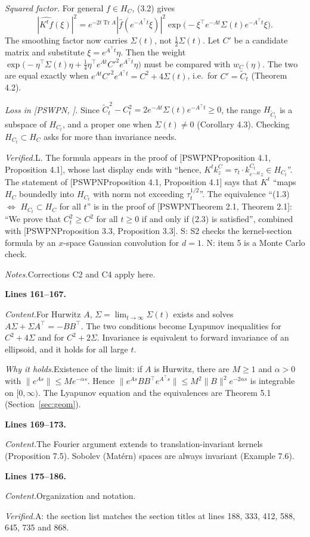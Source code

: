 \documentclass[11pt]{amsart}
\newcommand{\Tr}{\operatorname{Tr}}
\newcommand{\Ct}{\widetilde{C}_t}
\newcommand{\hatf}[1]{\widehat{#1}}
\newcommand{\tp}{\top}
\newcommand{\src}[1]{\par\bigskip\noindent\textbf{Lines #1.}\enspace}
\newcommand{\content}{\par\smallskip\noindent\textit{Content.}\enspace}
\newcommand{\why}{\par\smallskip\noindent\textit{Why it holds.}\enspace}
\newcommand{\verified}{\par\smallskip\noindent\textit{Verified.}\enspace}
\newcommand{\notes}{\par\smallskip\noindent\textit{Notes.}\enspace}
\newcommand{\tA}{\textsf{A}}
\newcommand{\tS}{\textsf{S}}
\newcommand{\tN}{\textsf{N}}
\newcommand{\tL}{\textsf{L}}
\newcommand{\PS}[1][]{[PSWPN\ifx\relax#1\relax\else, #1\fi]}
\begin{document}
\emph{Squared factor.} For general $f\in H_C$, (3.2) gives
\[
|\hatf{K^tf}(\xi)|^2=e^{-2t\Tr A}|\hatf f(e^{-A^\tp t}\xi)|^2\exp\bigl(-\xi^\tp e^{-At}\Sigma(t)e^{-A^\tp t}\xi\bigr).
\]
The smoothing factor now carries $\Sigma(t)$, not $\frac12\Sigma(t)$. Let $C'$ be a candidate matrix and substitute
$\xi=e^{A^\tp t}\eta$. Then the weight $\exp\bigl(-\eta^\tp\Sigma(t)\eta+\frac14\eta^\tp e^{At}C'^2e^{A^\tp t}\eta\bigr)$
must be compared with $w_C(\eta)$. The two are equal exactly when $e^{At}C'^2e^{A^\tp t}=C^2+4\Sigma(t)$, i.e.\ for
$C'=\Ct$ (Theorem 4.2).

\emph{Loss in \PS.} Since $\Ct^{\,2}-C_t^2=2e^{-At}\Sigma(t)e^{-A^\tp t}\ge0$, the range $H_{\Ct}$ is a subspace of
$H_{C_t}$, and a proper one when $\Sigma(t)\ne0$ (Corollary 4.3). Checking $H_{C_t}\subset H_C$ asks for more than
invariance needs.
\verified \tL. The formula appears in the proof of \PS[Proposition 4.1], whose last display ends with ``hence,
$K^tk^C_z=\tau_t\cdot k^{C_t}_{e^{-At}z}\in H_{C_t}$''. The statement of \PS[Proposition 4.1] says that $K^t$ ``maps
$H_C$ boundedly into $H_{C_t}$ with norm not exceeding $\tau_t^{1/2}$''. The equivalence ``(1.3) $\iff$
$H_{C_t}\subset H_C$ for all $t$'' is in the proof of \PS[Theorem 2.1]: ``We prove that $C_t^2\ge C^2$ for all $t\ge0$
if and only if (2.3) is satisfied'', combined with \PS[Proposition 3.3]. \tS: S2 checks the kernel-section formula by
an $x$-space Gaussian convolution for $d=1$. \tN: item 5 is a Monte Carlo check.
\notes Corrections C2 and C4 apply here.

\src{161--167}
\content For Hurwitz $A$, $\Sigma=\lim_{t\to\infty}\Sigma(t)$ exists and solves $A\Sigma+\Sigma A^\tp=-BB^\tp$. The
two conditions become Lyapunov inequalities for $C^2+4\Sigma$ and for $C^2+2\Sigma$. Invariance is equivalent to
forward invariance of an ellipsoid, and it holds for all large $t$.
\why Existence of the limit: if $A$ is Hurwitz, there are $M\ge1$ and $\alpha>0$ with $\|e^{As}\|\le Me^{-\alpha s}$.
Hence $\|e^{As}BB^\tp e^{A^\tp s}\|\le M^2\|B\|^2e^{-2\alpha s}$ is integrable on $[0,\infty)$. The Lyapunov equation
and the equivalences are Theorem 5.1 (Section~\ref{sec:geom}).

\src{169--173}
\content The Fourier argument extends to translation-invariant kernels (Proposition 7.5). Sobolev (Mat\'ern) spaces
are always invariant (Example 7.6).

\src{175--186}
\content Organization and notation.
\verified \tA: the section list matches the section titles at lines 188, 333, 412, 588, 645, 735 and 868.
\end{document}
